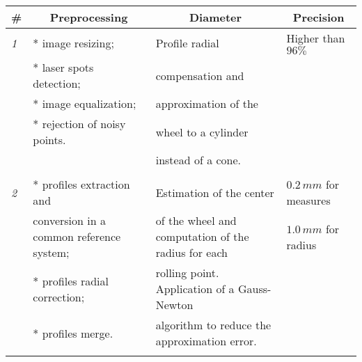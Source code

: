 
\begin{table}[t!]
\footnotesize
\centering
\begin{tabular}{|l|p{4cm}|p{4cm}|l|}

\hline
\multicolumn{1}{|c|}{\textbf{\#}} & \multicolumn{1}{c|}{\textbf{Preprocessing}} & \multicolumn{1}{c|}{\textbf{Diameter}} & \multicolumn{1}{c|}{\textbf{Precision}} \\

\hline
\textit{1}  & * image resizing;                                                  & Profile radial                                                               & Higher than $96\%$  \\
            & * laser spots detection;                                           & compensation and                                                             &                     \\
            & * image equalization;                                              & approximation of the                                                         &                     \\
            & * rejection of noisy points.                                       & wheel to a cylinder                                                          &                     \\
			&                                                                    & instead of a cone.                                                           &                     \\
			&                                                                    &                                                                              &                     \\
			
\hline
\textit{2}  & * profiles extraction and                                          & Estimation of the center                                                     & $0.2 \, mm$ for measures \\
            & conversion in a common reference system;                           & of the wheel and computation of the radius for each                          & $1.0 \, mm$ for radius   \\
            & * profiles radial correction;                                      & rolling point. Application of a Gauss-Newton                                 &                          \\
            & * profiles merge.                                                  & algorithm to reduce the approximation error.                                 &                          \\
            &                                                                    &                                                                              &                          \\


\end{tabular}
\end{table}
